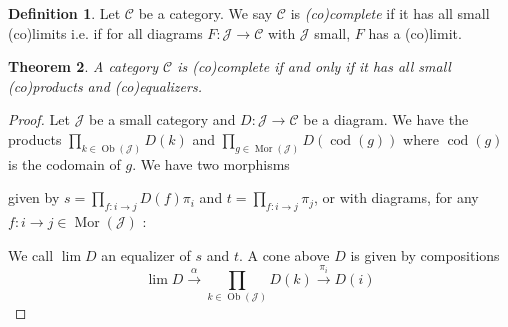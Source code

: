 \documentclass{article}
\newcommand{\cat}{\mathcal{C}}
\newcommand{\Jcat}{\mathcal{J}}
\DeclareMathOperator{\Ob}{Ob}
\DeclareMathOperator{\Mor}{Mor}
\DeclareMathOperator{\cod}{cod}
\theoremstyle{plain}
\newtheorem{theorem}{Theorem}[section]
\theoremstyle{definition}
\newtheorem{definition}[theorem]{Definition}
\theoremstyle{remark}
\begin{document}
\begin{definition}
    Let $\cat$ be a category. We say $\cat$ is \emph{(co)complete} if it has all small (co)limits i.e. if for all diagrams $F : \Jcat \to \cat$ with $\Jcat$ small, $F$ has a (co)limit.
\end{definition}

\begin{theorem}
    A category $\cat$ is (co)complete if and only if it has all small (co)products and (co)equalizers.
\end{theorem}

\begin{proof}
    Let $\Jcat$ be a small category and $D : \Jcat \to \cat$ be a diagram. We have the products $\prod\limits_{k \in \Ob(\Jcat)} D(k)$ and $\prod\limits_{g \in \Mor(\Jcat)} D(\cod(g))$ where $\cod(g)$ is the codomain of $g$. We have two morphisms
    \begin{center}
    \end{center}
    given by $s = \prod_{f : i \to j} D(f)\pi_i$ and $t = \prod_{f : i \to j} \pi_j$, or with diagrams, for any $f : i \to j \in \Mor(\Jcat)$ :
    \begin{center}
        \hspace{1cm}
    \end{center}
    We call $\lim D$ an equalizer of $s$ and $t$. A cone above $D$ is given by compositions \[\lim D \xrightarrow{\alpha} \prod\limits_{k \in \Ob(\Jcat)} D(k)\xrightarrow{\pi_i} D(i)\]

\end{proof}
\end{document}

